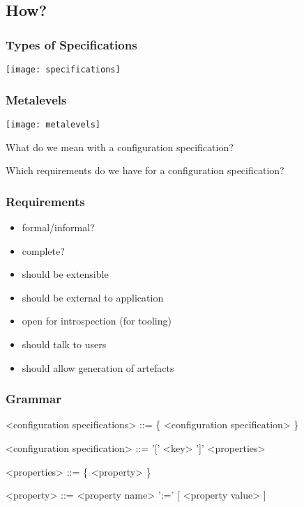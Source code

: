\subsection{How?}

\begin{frame}
	\frametitle{Types of Specifications}
	\texttt{[image: specifications]}
\end{frame}

\begin{frame}
	\frametitle{Metalevels}
	\texttt{[image: metalevels]}
\end{frame}

\begin{assignment}
	\begin{task}
	What do we mean with a configuration specification?
	\end{task}

	\begin{task}
	Which requirements do we have for a configuration specification?
	\end{task}
\end{assignment}


\begin{frame}
	\frametitle{Requirements}

	\begin{itemize}
	\item formal/informal?
	\item complete?
	\pause
	\item should be extensible
	\item should be external to application
	\item open for introspection (for tooling)
	\item should talk to users
	\item should allow generation of artefacts
	\end{itemize}
\end{frame}


\begin{frame}[fragile]
	\frametitle{Grammar}
	\begin{grammar}
	<configuration specifications> ::= \{ <configuration specification> \}

	<configuration specification> ::= '[' <key> ']' <properties>

	<properties> ::= \{ <property> \}

	<property> ::= <property name> ':=' [ <property value> ]
	\end{grammar}
\end{frame}


